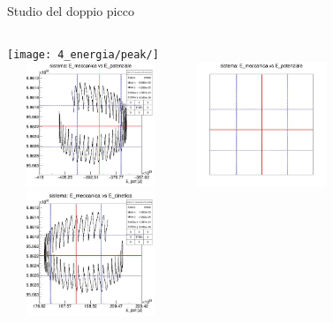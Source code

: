         \begin{frame}{Studio del doppio picco}
            \begin{columns}
                    \centering        
                    \texttt{[image: 4\_energia/peak/]}\\
                    \includegraphics[width=5cm,height=3.75cm]{4_energia/peak/Mec_pot.jpg}
                    \label{cfr::Epc}              
                    \centering        
                    \includegraphics[width=5cm,height=3.75cm]{4_energia/peak/m_p_500.jpg}\\
                    \includegraphics[width=5cm,height=3.75cm]{4_energia/peak/mec_cin.jpg}
                    \label{cfr::eme}      
            \end{columns}
        \end{frame}
